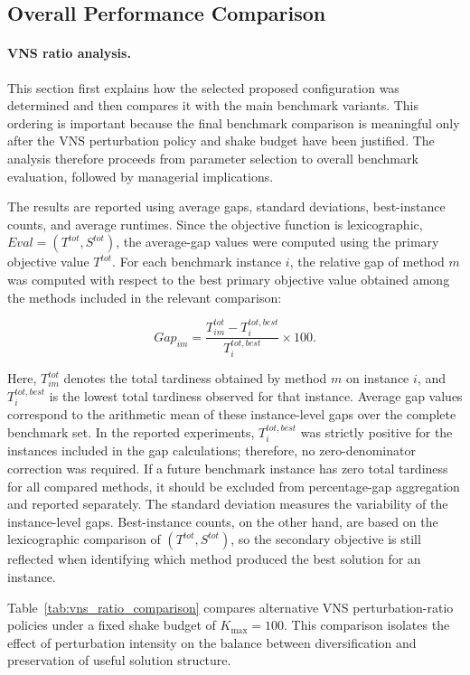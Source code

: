 \subsection{Overall Performance Comparison}
\label{subsec:overall_results}

\paragraph{VNS ratio analysis.}

This section first explains how the selected proposed configuration was determined and then compares it with the main benchmark variants. This ordering is important because the final benchmark comparison is meaningful only after the VNS perturbation policy and shake budget have been justified. The analysis therefore proceeds from parameter selection to overall benchmark evaluation, followed by managerial implications.

The results are reported using average gaps, standard deviations, best-instance counts, and average runtimes. Since the objective function is lexicographic, \(Eval=(T^{tot}, S^{tot})\), the average-gap values were computed using the primary objective value \(T^{tot}\). For each benchmark instance \(i\), the relative gap of method \(m\) was computed with respect to the best primary objective value obtained among the methods included in the relevant comparison:

\[
Gap_{im} =
\frac{T^{tot}_{im} - T^{tot,best}_{i}}
     {T^{tot,best}_{i}}
\times 100 .
\]

Here, \(T^{tot}_{im}\) denotes the total tardiness obtained by method \(m\) on instance \(i\), and \(T^{tot,best}_{i}\) is the lowest total tardiness observed for that instance. Average gap values correspond to the arithmetic mean of these instance-level gaps over the complete benchmark set. In the reported experiments, \(T^{tot,best}_{i}\) was strictly positive for the instances included in the gap calculations; therefore, no zero-denominator correction was required. If a future benchmark instance has zero total tardiness for all compared methods, it should be excluded from percentage-gap aggregation and reported separately. The standard deviation measures the variability of the instance-level gaps. Best-instance counts, on the other hand, are based on the lexicographic comparison of \((T^{tot}, S^{tot})\), so the secondary objective is still reflected when identifying which method produced the best solution for an instance.

Table~\ref{tab:vns_ratio_comparison} compares alternative VNS perturbation-ratio policies under a fixed shake budget of \(K_{\max}=100\). This comparison isolates the effect of perturbation intensity on the balance between diversification and preservation of useful solution structure.

